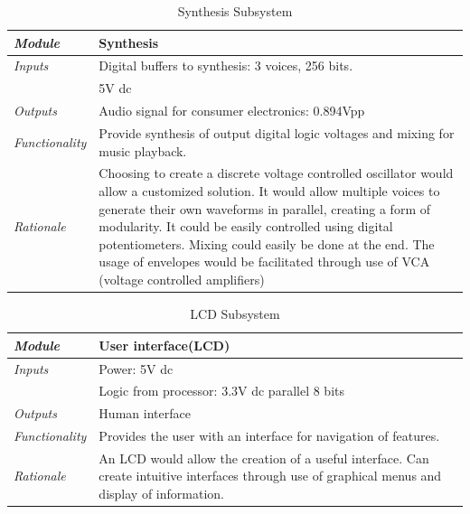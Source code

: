\documentclass[bibtotocnumbered,abstract=on,paper=a4,fontsize=12pt,parskip=on,halfparskip=on]{scrartcl}		%
\begin{document}
      \begin{table}[H]
      \caption{Synthesis Subsystem}
      \vskip 0.3cm 
      \begin{tabularx}{\linewidth}{  l X }
        \textit{Module} & Synthesis\\
        \hline
        \textit{Inputs} & Digital buffers to synthesis: 3 voices, 256 bits.\\
           & 5V dc\\
        \hline
        \textit{Outputs} & Audio signal for consumer electronics: 0.894Vpp\\
        \hline
        \textit{Functionality} & Provide synthesis of output digital logic voltages and mixing for music playback.\\
        \hline
        \textit{Rationale} & Choosing to create a discrete voltage controlled oscillator would allow a customized solution. It would allow multiple voices to generate their own waveforms in parallel, creating a form of modularity. It could be easily controlled using digital potentiometers.  Mixing could easily be done at the end. The usage of envelopes would be facilitated through use of VCA (voltage controlled amplifiers)\\
      \end{tabularx}
      \end{table}
      \begin{table}[H]
      \caption{LCD Subsystem}
      \vskip 0.3cm
      \begin{tabularx}{\linewidth}{  l X }
        \textit{Module} & User interface(LCD) \\
        \hline
        \textit{Inputs} & Power: 5V dc\\
           & Logic from processor: 3.3V dc parallel 8 bits\\
        \hline
        \textit{Outputs} & Human interface\\
        \hline
        \textit{Functionality} & Provides the user with an interface for navigation of features.\\
        \hline
        \textit{Rationale} & An LCD would allow the creation of a useful interface. Can create intuitive interfaces through use of graphical menus and display of information.\\
      \end{tabularx}
      \end{table}
\end{document}

